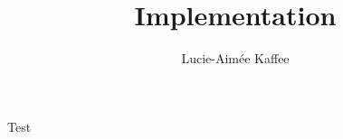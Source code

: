 \documentclass[11pt]{article}
\title {{Implementation}}
\author {Lucie-Aim\'{e}e Kaffee}
\date{}
\begin{document}
Test
\end{document}
